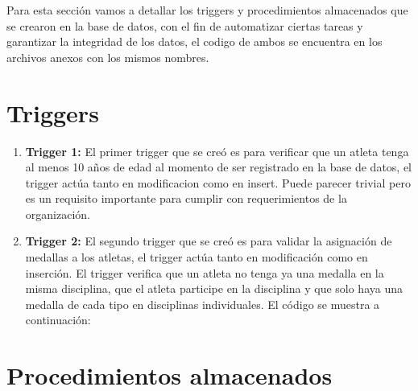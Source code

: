 Para esta sección vamos a detallar los triggers y procedimientos almacenados que se crearon en la base de datos, con el fin de automatizar ciertas tareas y garantizar la integridad de los datos, el codigo de ambos se encuentra en los archivos anexos con los mismos nombres.

\section{Triggers}

\begin{enumerate}
    \item \textbf{Trigger 1:} 
    El primer trigger que se creó es para verificar que un atleta tenga al menos 10 años de edad al momento de ser registrado en la base de datos, el trigger actúa tanto en modificacion como en insert. Puede parecer trivial pero es un requisito importante para cumplir con requerimientos de la organización.


    \item \textbf{Trigger 2:} 
    El segundo trigger que se creó es para validar la asignación de medallas a los atletas, el trigger actúa tanto en modificación como en inserción. El trigger verifica que un atleta no tenga ya una medalla en la misma disciplina, que el atleta participe en la disciplina y que solo haya una medalla de cada tipo en disciplinas individuales. El código se muestra a continuación: \vspace{0.5cm}



        


\end{enumerate}

\section{Procedimientos almacenados}